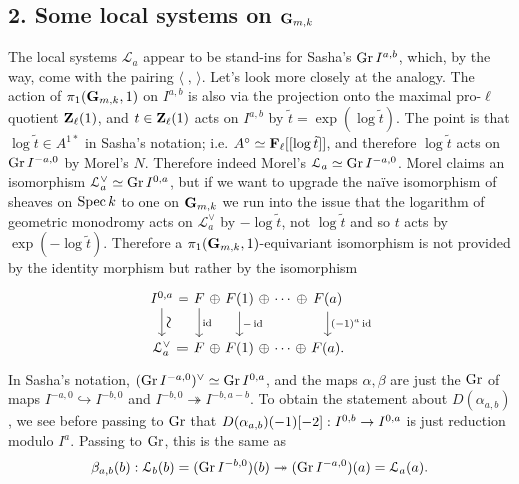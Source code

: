 \documentclass[deligne.tex]{subfiles}
\begin{document}
\subsection*{2. Some local systems on $\mathbf{G}_{m,k}$}
The local systems $\mathcal L_a$ appear to
be stand-ins for Sasha's $\operatorname{Gr} I^{a,b}$, which, by the way, come with the 
pairing $\langle\;,\,\rangle$. Let's look more closely at the analogy.
The action of $\pi_1(\mathbf{G}_{m,k},1)$ on $I^{a,b}$ is also via the 
projection onto the maximal pro-$\ell$ quotient $\mathbf{Z}_\ell(1)$, and
$t\in\mathbf{Z}_\ell(1)$ acts on $I^{a,b}$ by $\tilde t=\exp(\log\tilde t)$.
The point is that $\log\tilde t\in A^{1*}$ in Sasha's notation; i.e.
$A^\circ\simeq\mathbf{F}_\ell[[\log\tilde t]]$, and therefore $\log\tilde t$
acts on $\operatorname{Gr} I^{-a,0}$ by Morel's $N$.
Therefore indeed Morel's $\mathcal L_a\simeq\operatorname{Gr} I^{-a,0}$.
Morel claims an isomorphism $\mathcal L_a^\vee\simeq\operatorname{Gr} I^{0,a}$, but
if we want to upgrade the naïve isomorphism of sheaves on $\operatorname{Spec} k$ to one
on $\mathbf{G}_{m,k}$ we run into the issue that the logarithm of geometric 
monodromy acts on $\mathcal L_a^\vee$ by $-\log\tilde t$, not $\log\tilde t$
and so $t$ acts by $\exp(-\log\tilde t)$. Therefore a
$\pi_1(\mathbf{G}_{m,k},1)$-equivariant isomorphism is not provided by the identity
morphism but rather by the isomorphism
\begin{equation*}\begin{tikzcd}[column sep=tiny]
	I^{0,a}\arrow[d,"\text{\scalebox{1.5}{\rotatebox{-90}{$\sim$}}}"]\arrow[r,equals]
	&F\arrow[r,phantom,"\oplus"]\arrow[d,"\id"]
	&F(1)\arrow[r,phantom,"\oplus"]\arrow[d,"-\id"]
	&\cdots\arrow[r,phantom,"\oplus"]
	&F(a)\arrow[d,"(-1)^a\id"] \\
	\mathcal L_a^\vee\arrow[r,equals]
	&F\arrow[r,phantom,"\oplus"]
	&F(1)\arrow[r,phantom,"\oplus"]
	&\cdots\arrow[r,phantom,"\oplus"]
	&F(a).
\end{tikzcd}\end{equation*}
In Sasha's notation, $(\operatorname{Gr} I^{-a,0})^\vee\simeq\operatorname{Gr} I^{0,a}$, and the maps
$\alpha,\beta$ are just the $\operatorname{Gr}$ of maps $I^{-a,0}\hookrightarrow I^{-b,0}$
and $I^{-b,0}\twoheadrightarrow I^{-b,a-b}$. To obtain the statement about
$D(\alpha_{a,b})$, we see before passing to $\operatorname{Gr}$ that
$D(\alpha_{a,b})(-1)[-2]:I^{0,b}\rightarrow I^{0,a}$ is just reduction modulo $I^a$.
Passing to $\operatorname{Gr}$, this is the same as
\begin{equation*}
	\beta_{a,b}(b):\mathcal L_b(b)=(\operatorname{Gr} I^{-b,0})(b)\twoheadrightarrow
	(\operatorname{Gr} I^{-a,0})(a)=\mathcal L_a(a).
\end{equation*}
\end{document}
